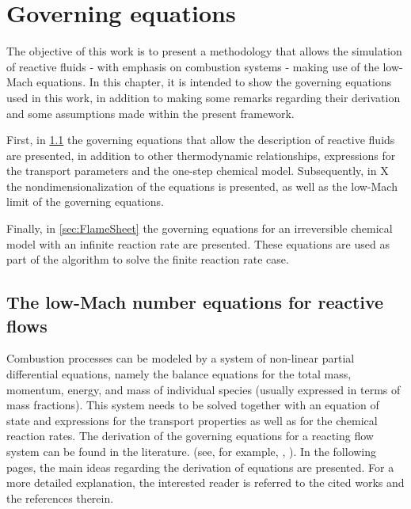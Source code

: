 \chapter{Governing equations}	\label{ch:gov_eqs}
\glsresetall
The objective of this work is to present a methodology that allows the simulation of reactive fluids - with emphasis on combustion systems - making use of the low-Mach equations.  In this chapter, it is intended to show the governing equations used in this work, in addition to making some remarks regarding their derivation and some assumptions made within the present framework.


First, in \cref{sec:GovEqLowMach} the governing equations that allow the description of reactive fluids are presented, in addition to other thermodynamic relationships, expressions for the transport parameters and the one-step chemical model. Subsequently, in X the nondimensionalization of the equations is presented, as well as the low-Mach limit of the governing equations.

Finally, in \cref{sec:FlameSheet} the governing equations for an irreversible chemical model with an infinite reaction rate are presented. These equations are used as part of the algorithm to solve the finite reaction rate case.



\section{The low-Mach number equations for reactive flows} \label{sec:GovEqLowMach}
Combustion processes can be modeled by a system of non-linear partial differential equations, namely the balance equations for the total mass, momentum, energy, and mass of individual species (usually expressed in terms of mass fractions). This system needs to be solved together with an equation of state and expressions for the transport properties as well as for the chemical reaction rates.
The derivation of the governing equations for a reacting flow system can be found in the literature. (see, for example, \parencite{keeChemicallyReactingFlow2003}, \parencite{poinsotTheoreticalNumericalCombustion2005}). In the following pages, the main ideas regarding the derivation of equations are presented. For a more detailed explanation,  the interested reader is referred to the cited works and the references therein.

